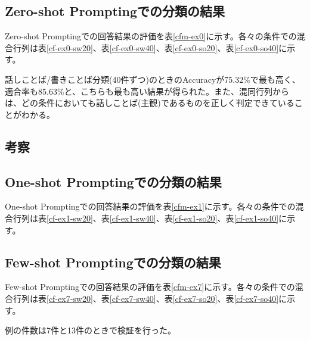 \subsection{Zero-shot Promptingでの分類の結果}
Zero-shot Promptingでの回答結果の評価を表\ref{cfm-ex0}に示す。各々の条件での混合行列は表\ref{cf-ex0-sw20}、表\ref{cf-ex0-sw40}、表\ref{cf-ex0-so20}、表\ref{cf-ex0-so40}に示す。






話しことば/書きことば分類(40件ずつ)のときのAccuracyが75.32\%で最も高く、適合率も85.63\%と、こちらも最も高い結果が得られた。また、混同行列からは、どの条件においても話しことば(主観)であるものを正しく判定できていることがわかる。

\subsection{考察}

\subsection{One-shot Promptingでの分類の結果}
One-shot Promptingでの回答結果の評価を表\ref{cfm-ex1}に示す。各々の条件での混合行列は表\ref{cf-ex1-sw20}、表\ref{cf-ex1-sw40}、表\ref{cf-ex1-so20}、表\ref{cf-ex1-so40}に示す。







\subsection{Few-shot Promptingでの分類の結果}
Few-shot Promptingでの回答結果の評価を表\ref{cfm-ex7}に示す。各々の条件での混合行列は表\ref{cf-ex7-sw20}、表\ref{cf-ex7-sw40}、表\ref{cf-ex7-so20}、表\ref{cf-ex7-so40}に示す。

例の件数は7件と13件のときで検証を行った。





